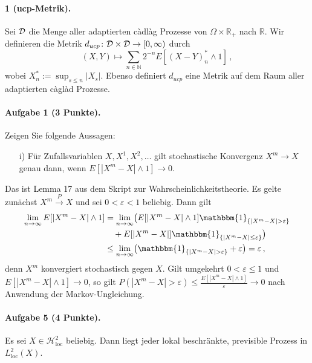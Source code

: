 \documentclass{article}
\begin{document}
\paragraph{ 1 (ucp-Metrik).}
Sei ${\cal D}$ die Menge aller adaptierten càdlàg Prozesse von $\Omega\times\mathbb{R}_+$ nach $\mathbb{R}$.
Wir definieren die Metrik $d_{ucp}\colon {\cal D}\times {\cal D}\to[0,\infty)$ durch
\begin{equation}
(X,Y)\mapsto \sum_{n\in\mathbb{N}}2^{-n}E[(X-Y)^*_n\wedge 1]\,,
\end{equation}
wobei $X^*_n:=\sup_{s\leq n}|X_s|$.
Ebenso definiert $d_{ucp}$ eine Metrik auf dem Raum aller adaptierten càglàd Prozesse.

\paragraph{Aufgabe 1 \textnormal{(3 Punkte)}.}
Zeigen Sie folgende Aussagen:
\begin{enumerate}
\item [i)] Für Zufallsvariablen $X,X^1,X^2,\dots$ gilt stochastische Konvergenz $X^m\to X$ genau dann, wenn $E[|X^m-X|\wedge 1]\rightarrow0$.
\end{enumerate}
Das ist Lemma 17 aus dem Skript zur Wahrscheinlichkeitstheorie.
Es gelte zunächst $X^m\xrightarrow{P}X$ und sei $0<\varepsilon<1$ beliebig.
Dann gilt
\begin{align*}
  \lim_{n\to\infty}E[|X^m-X|\wedge1]
  &=\lim_{n\to\infty}\bigl(E[|X^m-X|\wedge1]\mathbbm{1}_{\{|X^m-X|>\varepsilon\}}\\
  &\quad+E[|X^m-X|]\mathbbm{1}_{\{|X^m-X|\leq\varepsilon\}}\bigr)\\
  &\leq\lim_{n\to\infty}\bigl(\mathbbm{1}_{\{|X^m-X|>\varepsilon\}}+\varepsilon\bigr)=\varepsilon\,,
\end{align*}
denn $X^m$ konvergiert stochastisch gegen $X$.
Gilt umgekehrt $0<\varepsilon\leq 1$ und $E[|X^m-X|\wedge 1]\to0$, so gilt $P(|X^m-X|>\varepsilon)\leq\frac{E[|X^m-X|\wedge1]}{\varepsilon}\to0$ nach Anwendung der Markov-Ungleichung.
\paragraph{Aufgabe 5 \textnormal{(4 Punkte)}.}
Es sei $X\in\mathscr{H}_{\text{loc}}^2$ beliebig.
Dann liegt jeder lokal beschränkte, previsible Prozess in $L_{\text{loc}}^2(X)$.
\end{document}
